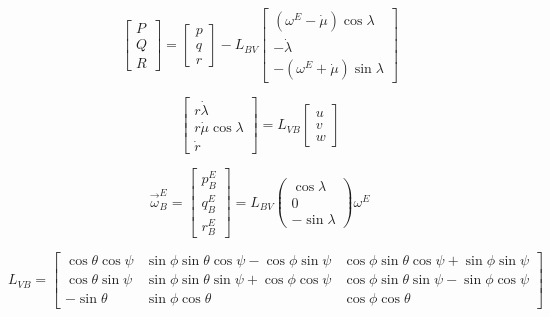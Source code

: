 \documentclass[10pt]{article}
\begin{document}
$$\begin{bmatrix}P\\Q\\R\end{bmatrix} =
  \begin{bmatrix}p\\q\\r\end{bmatrix} - 
  L_{BV}\begin{bmatrix}(\omega^E -
 \dot{\mu})\cos{\lambda}\\-\dot{\lambda}\\
 -(\omega^E + \dot{\mu})\sin{\lambda}\end{bmatrix}$$

$$\begin{bmatrix}r\dot{\lambda}\\r\dot{\mu}\cos{\lambda}\\\dot{r}
  \end{bmatrix} = L_{VB}\begin{bmatrix}u\\v\\w\end{bmatrix}$$

$$\vec{\omega}^E_B = \begin{bmatrix}p^E_B\\q^E_B\\r^E_B\end{bmatrix} =
L_{BV}\begin{pmatrix}\cos{\lambda}\\0\\-\sin{\lambda}\end{pmatrix}\omega^E$$


$$L_{VB} = \begin{bmatrix}\cos{\theta}\cos{\psi}&
             \sin{\phi}\sin{\theta}\cos{\psi} - \cos{\phi}\sin{\psi}&
             \cos{\phi}\sin{\theta}\cos{\psi} + \sin{\phi}\sin{\psi}\\
             \cos{\theta}\sin{\psi}&
             \sin{\phi}\sin{\theta}\sin{\psi} + \cos{\phi}\cos{\psi}&
             \cos{\phi}\sin{\theta}\sin{\psi} - \sin{\phi}\cos{\psi}\\
             -\sin{\theta}&
             \sin{\phi}\cos{\theta}&
             \cos{\phi}\cos{\theta}\end{bmatrix}$$
\end{document}
